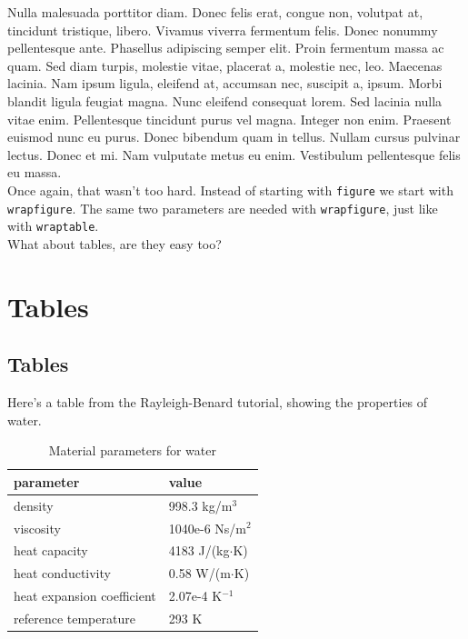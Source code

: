 Nulla malesuada porttitor diam. Donec felis erat, congue non, volutpat at, tincidunt tristique, libero. Vivamus viverra fermentum felis. Donec nonummy pellentesque ante. Phasellus adipiscing semper elit. Proin fermentum massa ac quam. Sed diam turpis, molestie vitae, placerat a, molestie nec, leo. Maecenas lacinia. Nam ipsum ligula, eleifend at, accumsan nec, suscipit a, ipsum. Morbi blandit ligula feugiat magna. Nunc eleifend consequat lorem. Sed lacinia nulla vitae enim. Pellentesque tincidunt purus vel magna. Integer non enim. Praesent euismod nunc eu purus. Donec bibendum quam in tellus. Nullam cursus pulvinar lectus. Donec et mi. Nam vulputate metus eu enim. Vestibulum pellentesque felis eu massa.\\

Once again, that wasn't too hard.  Instead of starting with \texttt{figure} we start with \texttt{wrapfigure}.  The same two parameters are needed with \texttt{wrapfigure}, just like with \texttt{wraptable}.\\

What about tables, are they easy too?

\newpage

\chapter{Tables}

\section{Tables}

Here's a table from the Rayleigh-Benard tutorial, showing the properties of water.\\

\begin{table}[h]
\caption{Material parameters for water}
\label{tb:matpar}
\centering
\begin{tabular}{ll} \hline
parameter  & value \\ \hline
density & 998.3 kg/m$^{3}$ \\
viscosity & 1040e-6 Ns/m$^{2}$ \\
heat capacity & 4183 J/(kg$\cdot$K) \\
heat conductivity & 0.58 W/(m$\cdot$K)       \\
heat expansion coefficient & 2.07e-4 K$^{-1}$      \\ 
reference temperature & 293 K       \\ \hline
\end{tabular}
\end{table}


